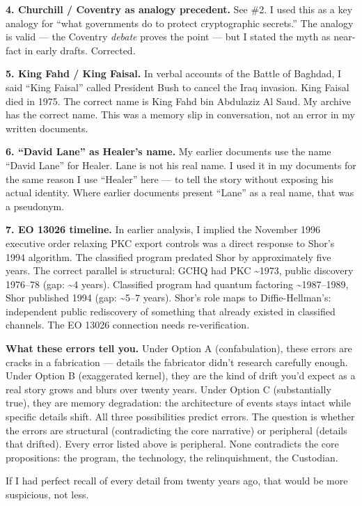 \textbf{4. Churchill / Coventry as analogy precedent.} See \#2. I used this as a key analogy for ``what governments do to protect cryptographic secrets.'' The analogy is valid --- the Coventry \textit{debate} proves the point --- but I stated the myth as near-fact in early drafts. Corrected.

\textbf{5. King Fahd / King Faisal.} In verbal accounts of the Battle of Baghdad, I said ``King Faisal'' called President Bush to cancel the Iraq invasion. King Faisal died in 1975. The correct name is King Fahd bin Abdulaziz Al Saud. My archive has the correct name. This was a memory slip in conversation, not an error in my written documents.

\textbf{6. ``David Lane'' as Healer's name.} My earlier documents use the name ``David Lane'' for Healer. Lane is not his real name. I used it in my documents for the same reason I use ``Healer'' here --- to tell the story without exposing his actual identity. Where earlier documents present ``Lane'' as a real name, that was a pseudonym.

\textbf{7. EO 13026 timeline.} In earlier analysis, I implied the November 1996 executive order relaxing PKC export controls was a direct response to Shor's 1994 algorithm. The classified program predated Shor by approximately five years. The correct parallel is structural: GCHQ had PKC \textasciitilde{}1973, public discovery 1976--78 (gap: \textasciitilde{}4 years). Classified program had quantum factoring \textasciitilde{}1987--1989, Shor published 1994 (gap: \textasciitilde{}5--7 years). Shor's role maps to Diffie-Hellman's: independent public rediscovery of something that already existed in classified channels. The EO 13026 connection needs re-verification.

\vspace{1cm}

\textbf{What these errors tell you.} Under Option A (confabulation), these errors are cracks in a fabrication --- details the fabricator didn't research carefully enough. Under Option B (exaggerated kernel), they are the kind of drift you'd expect as a real story grows and blurs over twenty years. Under Option C (substantially true), they are memory degradation: the architecture of events stays intact while specific details shift. All three possibilities predict errors. The question is whether the errors are structural (contradicting the core narrative) or peripheral (details that drifted). Every error listed above is peripheral. None contradicts the core propositions: the program, the technology, the relinquishment, the Custodian.

If I had perfect recall of every detail from twenty years ago, that would be more suspicious, not less.
